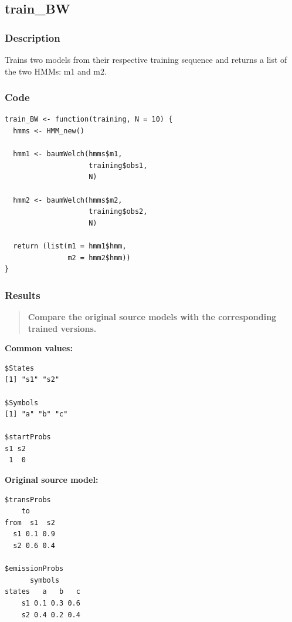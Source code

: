 \documentclass[a4paper]{article}
\begin{document}
\subsection{train\_BW}

\subsubsection{Description}

Trains two models from their respective training sequence and returns a list of the two HMMs: m1 and m2.

\subsubsection{Code}

\begin{lstlisting}
train_BW <- function(training, N = 10) {
  hmms <- HMM_new()
  
  hmm1 <- baumWelch(hmms$m1,
                    training$obs1,
                    N)

  hmm2 <- baumWelch(hmms$m2,
                    training$obs2,
                    N)
  
  return (list(m1 = hmm1$hmm,
               m2 = hmm2$hmm))
}
\end{lstlisting}

\subsubsection{Results}

\begin{quotation}
\textbf{Compare the original source models with the corresponding trained versions.}
\end{quotation}

\textbf{Common values:}

\begin{lstlisting}
$States
[1] "s1" "s2"

$Symbols
[1] "a" "b" "c"

$startProbs
s1 s2 
 1  0 
\end{lstlisting}

\textbf{Original source model:}

\begin{lstlisting}
$transProbs
    to
from  s1  s2
  s1 0.1 0.9
  s2 0.6 0.4

$emissionProbs
      symbols
states   a   b   c
    s1 0.1 0.3 0.6
    s2 0.4 0.2 0.4
\end{lstlisting}
\end{document}
